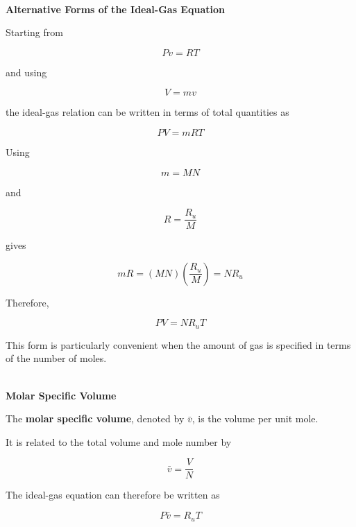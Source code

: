 \documentclass[12pt]{article}
\begin{document}
\textbf{\\ Alternative Forms of the Ideal-Gas Equation}

Starting from

\begin{equation*}
Pv=RT
\end{equation*}

and using

\begin{equation*}
V=mv
\end{equation*}

the ideal-gas relation can be written in terms of total quantities as

\begin{equation*}
\boxed{PV=mRT}
\end{equation*}

Using

\begin{equation*}
m=MN
\end{equation*}

and

\begin{equation*}
R=\frac{R_u}{M}
\end{equation*}

gives

\begin{equation*}
mR=(MN)\left(\frac{R_u}{M}\right)=NR_u
\end{equation*}

Therefore,

\begin{equation*}
\boxed{PV=NR_uT}
\end{equation*}

This form is particularly convenient when the amount of gas is specified in terms of the number of moles.

\textbf{\\ Molar Specific Volume}

The \textbf{molar specific volume}, denoted by $\bar{v}$, is the volume per unit mole.

It is related to the total volume and mole number by

\begin{equation*}
\bar{v}=\frac{V}{N}
\end{equation*}

The ideal-gas equation can therefore be written as

\begin{equation*}
\boxed{P\bar{v}=R_uT}
\end{equation*}
\end{document}
